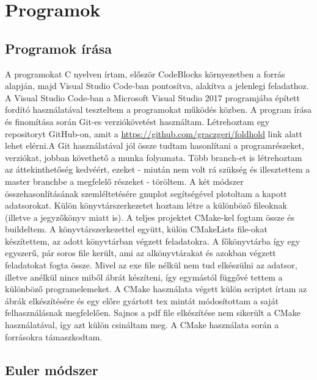 \documentclass[a4paper, 12pt]{article}
\begin{document}
\section{Programok}
\label{sec:prog}

\subsection{Programok írása}
\label{progiras}

A programokat C nyelven írtam, először CodeBlocks környezetben a \cite{artic:negyedik} forrás alapján, majd Visual Studio Code-ban pontosítva, alakítva a jelenlegi feladathoz. A Visual Studio Code-ban a Microsoft Visual Studio 2017 programjába épített fordító használatával teszteltem a programokat működés közben. A program írása és finomítása során Git-es verziókövetést használtam. Létrehoztam egy repositoryt GitHub-on, amit a \url{https://github.com/graczgeri/foldhold} link alatt lehet elérni.A Git használatával jól össze tudtam hasonlítani a programrészeket, verziókat, jobban követhető a munka folyamata. Több branch-et is létrehoztam az áttekinthetőség kedvéért, ezeket - miután nem volt rá szükség és illesztettem a master branchbe a megfelelő részeket - töröltem. A két módszer összehasonlításának szemléltetésére gnuplot segítségével plotoltam a kapott adatsorokat. Külön könyvtárszerkezetet hoztam létre a különböző fileoknak (illetve a jegyzőkönyv miatt is). A teljes projektet CMake-kel fogtam össze és buildeltem. A könyvtárszerkezettel együtt, külön CMakeLists file-okat készítettem, az adott könyvtárban végzett feladatokra. A főkönyvtárba így egy egyszerű, pár soros file került, ami az alkönyvtárakat és azokban végzett feladatokat fogta össze. Mivel az exe file nélkül nem tud elkészülni az adatsor, illetve anélkül nincs miből ábrát készíteni, így egymástól függővé tettem a különböző programelemeket. A CMake használata végett külön scriptet írtam az ábrák elkészítésére és egy előre gyártott tex mintát módosítottam a saját felhasználásnak megfelelően. Sajnos a pdf file elkészítése nem sikerült a CMake használatával, így azt külön csináltam meg. A CMake használata során a \cite{artic:elso,artic:masodik} forrásokra támaszkodtam.
\subsection{Euler módszer}
\label{subsec:euler_1}
\end{document}
